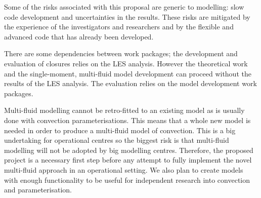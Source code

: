 \documentclass[11pt,a4paper]{article}
\begin{document}
Some of the risks associated with this proposal are generic to modelling: slow code development and uncertainties in the results. These risks are mitigated by the experience of the investigators and researchers and by the flexible and advanced code that has already been developed.

There are some dependencies between work packages; the development and evaluation of closures relies on the LES analysis. However the theoretical work and the single-moment, multi-fluid model development can proceed without the results of the LES analysis. The evaluation relies on the model development work packages.

Multi-fluid modelling cannot be retro-fitted to an existing model as is usually done with convection parameterisations. This means that a whole new model is needed in order to produce a multi-fluid model of convection. This is a big undertaking for operational centres so the biggest risk is that multi-fluid modelling will not be adopted by big modelling centres. {\color{green} Therefore, the proposed project is a necessary first step before any attempt to fully implement the novel multi-fluid approach in an operational setting. We also plan} to create models with enough functionality to be useful for independent research into convection and parameterisation.

\renewcommand\refname{References (not included in Track Record)}

%


\newpage
\end{document}
